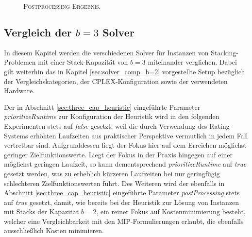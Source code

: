 \begin{figure}[H]
  \centering
    \caption{\textsc{Postprocessing-Ergebnis.}}
    \label{fig:valid_solution_post_processing}
\end{figure}

\subsection{Vergleich der $b = 3$ Solver}
\label{sec:solver_comp_b=3}

In diesem Kapitel werden die verschiedenen Solver für Instanzen von Stacking-Problemen mit einer Stack-Kapazität
von $b = 3$ miteinander verglichen. Dabei gilt weiterhin das in Kapitel \ref{sec:solver_comp_b=2} vorgestellte Setup
bezüglich der Vergleichskategorien, der \textsc{CPLEX}-Konfiguration sowie der verwendeten Hardware.

Der in Abschnitt \ref{sec:three_cap_heuristic} eingeführte Parameter \textit{prioritizeRuntime} zur Konfiguration der Heuristik
wird in den folgenden Experimenten stets auf \textit{false} gesetzt, weil die durch Verwendung des Rating-Systems erhöhten Laufzeiten
aus praktischer Perspektive vermutlich in jedem Fall vertretbar sind. Aufgrunddessen liegt der Fokus hier auf dem Erreichen
möglichst geringer Zielfunktionswerte. Liegt der Fokus in der Praxis hingegen auf einer möglichst geringen Laufzeit, so kann dementsprechend \textit{prioritizeRuntime} auf \textit{true} gesetzt werden, was zu erheblich kürzeren Laufzeiten bei nur geringfügig schlechteren Zielfunktionswerten führt.
Des Weiteren wird der ebenfalls in Abschnitt \ref{sec:three_cap_heuristic} eingeführte Parameter \textit{postProcessing}
stets auf \textit{true} gesetzt, damit, wie bereits bei der Heuristik zur Lösung von Instanzen mit Stacks der Kapazität $b = 2$,
ein reiner Fokus auf Kostenminimierung besteht, welcher eine Vergleichbarkeit mit den MIP-Formulierungen erlaubt, die ebenfalls
ausschließlich Kosten minimieren.

